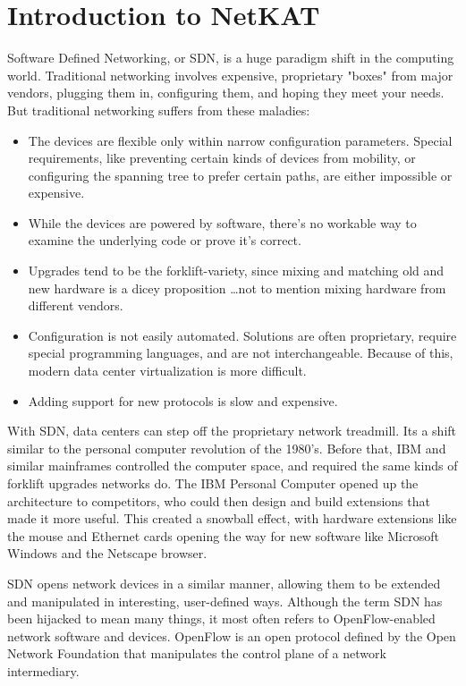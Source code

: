 
\chapter{Introduction to NetKAT}

Software Defined Networking, or SDN, is a huge paradigm shift in the computing world.  
Traditional networking involves 
expensive, proprietary "boxes" from major vendors, plugging them in, configuring them, and hoping they 
meet your needs.  
But traditional networking suffers from these maladies:

\begin{itemize}
\item The devices are flexible only within narrow configuration parameters. 
Special requirements, like preventing certain kinds of devices from mobility, or configuring 
the spanning tree to prefer certain paths, are either impossible or expensive.
\item While the devices are powered by software, there's no workable way to examine the underlying code or prove it's correct.  
\item Upgrades tend to be the forklift-variety, since mixing and matching old and new hardware is a dicey proposition
\ldots not to mention mixing hardware from different vendors.
\item Configuration is not easily automated. 
Solutions are often proprietary, require special programming languages, and are not interchangeable.
Because of this, modern data center virtualization is more difficult.
\item Adding support for new protocols is slow and expensive.
\end{itemize}

With SDN, data centers can step off the proprietary network treadmill.  
Its a shift similar to the personal computer revolution of the 1980's.
Before that, IBM and similar mainframes controlled the computer space, and required the same kinds of 
forklift upgrades networks do.
The IBM Personal Computer opened up the architecture to competitors, who could then design and build extensions
that made it more useful.
This created a snowball effect, with hardware extensions like the mouse and Ethernet cards opening the way 
for new software like Microsoft Windows and the Netscape browser.

SDN opens network devices in a similar manner, allowing them to be extended and manipulated in interesting,
user-defined ways.
Although the term SDN has been hijacked to mean many things, it most often refers to OpenFlow-enabled 
network software and devices.
OpenFlow is an open protocol defined by the Open Network Foundation that manipulates the control 
plane of a network intermediary.  

